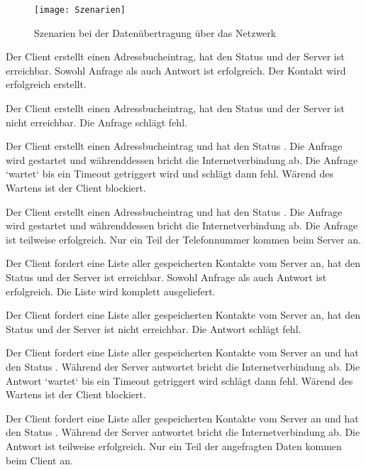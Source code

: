 \begin{figure}[H]
  \centering
  \texttt{[image: Szenarien]}
  \grayRule
  \caption{Szenarien bei der Datenübertragung über das Netzwerk}
  \label{fig:szenarien}
\end{figure}
\begin{description}[leftmargin=0.5cm,style=nextline]
\item[Szenario A0:]
Der Client erstellt einen Adressbucheintrag, hat den Status  und der Server ist erreichbar. Sowohl Anfrage als auch Antwort ist erfolgreich. Der Kontakt wird erfolgreich erstellt.\\
\item[Szenario A1:]
Der Client erstellt einen Adressbucheintrag, hat den Status  und der Server ist nicht erreichbar. Die Anfrage schlägt fehl.\\
\item[Szenario A2:]
Der Client erstellt einen Adressbucheintrag und hat den Status . Die Anfrage wird gestartet und währenddessen bricht die Internetverbindung ab. Die Anfrage `wartet` bis ein Timeout getriggert wird und schlägt dann fehl. Wärend des Wartens ist der Client blockiert.\\
\item[Szenario A3:]
Der Client erstellt einen Adressbucheintrag und hat den Status . Die Anfrage wird gestartet und währenddessen bricht die Internetverbindung ab. Die Anfrage ist teilweise erfolgreich. Nur ein Teil der Telefonnummer kommen beim Server an.\\
\item[Szenario S0:]
Der Client fordert eine Liste aller gespeicherten Kontakte vom Server an, hat den Status  und der Server ist erreichbar. Sowohl Anfrage als auch Antwort ist erfolgreich. Die Liste wird komplett ausgeliefert.\\
\item[Szenario S1:]
Der Client fordert eine Liste aller gespeicherten Kontakte vom Server an, hat den Status  und der Server ist nicht erreichbar. Die Antwort schlägt fehl.\\
\item[Szenario S2:]
Der Client fordert eine Liste aller gespeicherten Kontakte vom Server an und hat den Status . Während der Server antwortet bricht die Internetverbindung ab. Die Antwort `wartet` bis ein Timeout getriggert wird schlägt dann fehl. Wärend des Wartens ist der Client blockiert.\\
\item[Szenario S3:]
Der Client fordert eine Liste aller gespeicherten Kontakte vom Server an und hat den Status . Während der Server antwortet bricht die Internetverbindung ab. Die Antwort ist teilweise erfolgreich. Nur ein Teil der angefragten Daten kommen beim Client an.
\end{description}
